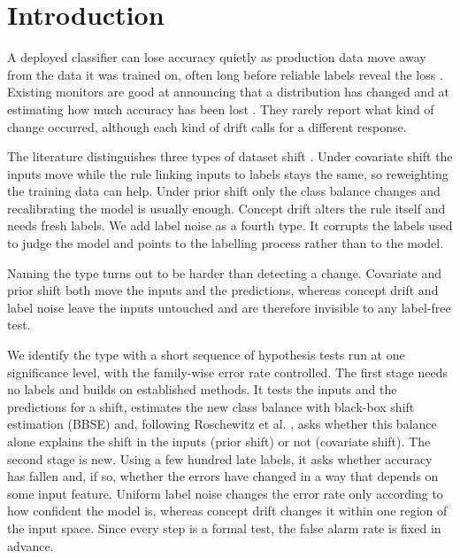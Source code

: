 \documentclass[10pt]{article}
\begin{document}
\section{Introduction}
\label{sec:intro}

A deployed classifier can lose accuracy quietly as production data move away from the data it was trained on, often long before reliable labels reveal the loss \cite{rabanser2019failing}. Existing monitors are good at announcing that a distribution has changed \cite{rabanser2019failing} and at estimating how much accuracy has been lost \cite{garg2022atc,kivimaki2025performance}. They rarely report what kind of change occurred, although each kind of drift calls for a different response.

The literature distinguishes three types of dataset shift \cite{moreno2012unifying}. Under covariate shift the inputs move while the rule linking inputs to labels stays the same, so reweighting the training data can help. Under prior shift only the class balance changes and recalibrating the model is usually enough. Concept drift alters the rule itself and needs fresh labels. We add label noise as a fourth type. It corrupts the labels used to judge the model and points to the labelling process rather than to the model.

Naming the type turns out to be harder than detecting a change. Covariate and prior shift both move the inputs and the predictions, whereas concept drift and label noise leave the inputs untouched and are therefore invisible to any label-free test.

We identify the type with a short sequence of hypothesis tests run at one significance level, with the family-wise error rate controlled. The first stage needs no labels and builds on established methods. It tests the inputs and the predictions for a shift, estimates the new class balance with black-box shift estimation (BBSE) \cite{lipton2018bbse} and, following Roschewitz et al. \cite{roschewitz2025shiftid}, asks whether this balance alone explains the shift in the inputs (prior shift) or not (covariate shift). The second stage is new. Using a few hundred late labels, it asks whether accuracy has fallen and, if so, whether the errors have changed in a way that depends on some input feature. Uniform label noise changes the error rate only according to how confident the model is, whereas concept drift changes it within one region of the input space. Since every step is a formal test, the false alarm rate is fixed in advance.
\end{document}

